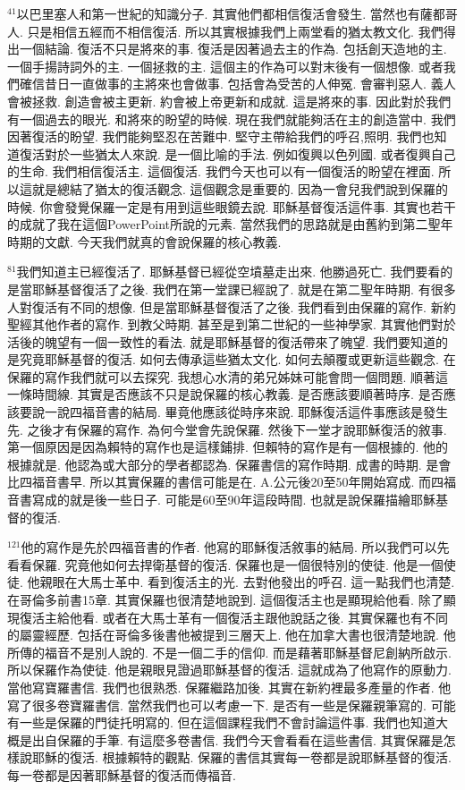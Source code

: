 \documentclass{book}
\begin{document}
$^{41}$以巴里塞人和第一世紀的知識分子.
其實他們都相信復活會發生.
當然也有薩都哥人.
只是相信五經而不相信復活.
所以其實根據我們上兩堂看的猶太教文化.
我們得出一個結論.
復活不只是將來的事.
復活是因著過去主的作為.
包括創天造地的主.
一個手揚詩詞外的主.
一個拯救的主.
這個主的作為可以對末後有一個想像.
或者我們確信昔日一直做事的主將來也會做事.
包括會為受苦的人伸冤.
會審判惡人.
義人會被拯救.
創造會被主更新.
約會被上帝更新和成就.
這是將來的事.
因此對於我們有一個過去的眼光.
和將來的盼望的時候.
現在我們就能夠活在主的創造當中.
我們因著復活的盼望.
我們能夠堅忍在苦難中.
堅守主帶給我們的呼召,照明.
我們也知道復活對於一些猶太人來說.
是一個比喻的手法.
例如復興以色列國.
或者復興自己的生命.
我們相信復活主.
這個復活.
我們今天也可以有一個復活的盼望在裡面.
所以這就是總結了猶太的復活觀念.
這個觀念是重要的.
因為一會兒我們說到保羅的時候.
你會發覺保羅一定是有用到這些眼鏡去說.
耶穌基督復活這件事.
其實也若干的成就了我在這個PowerPoint所說的元素.
當然我們的思路就是由舊約到第二聖年時期的文獻.
今天我們就真的會說保羅的核心教義.

$^{81}$我們知道主已經復活了.
耶穌基督已經從空墳墓走出來.
他勝過死亡.
我們要看的是當耶穌基督復活了之後.
我們在第一堂課已經說了.
就是在第二聖年時期.
有很多人對復活有不同的想像.
但是當耶穌基督復活了之後.
我們看到由保羅的寫作.
新約聖經其他作者的寫作.
到教父時期.
甚至是到第二世紀的一些神學家.
其實他們對於活後的魄望有一個一致性的看法.
就是耶穌基督的復活帶來了魄望.
我們要知道的是究竟耶穌基督的復活.
如何去傳承這些猶太文化.
如何去顛覆或更新這些觀念.
在保羅的寫作我們就可以去探究.
我想心水清的弟兄姊妹可能會問一個問題.
順著這一條時間線.
其實是否應該不只是說保羅的核心教義.
是否應該要順著時序.
是否應該要說一說四福音書的結局.
畢竟他應該從時序來說.
耶穌復活這件事應該是發生先.
之後才有保羅的寫作.
為何今堂會先說保羅.
然後下一堂才說耶穌復活的敘事.
第一個原因是因為賴特的寫作也是這樣鋪排.
但賴特的寫作是有一個根據的.
他的根據就是.
他認為或大部分的學者都認為.
保羅書信的寫作時期.
成書的時期.
是會比四福音書早.
所以其實保羅的書信可能是在.
A.公元後20至50年開始寫成.
而四福音書寫成的就是後一些日子.
可能是60至90年這段時間.
也就是說保羅描繪耶穌基督的復活.

$^{121}$他的寫作是先於四福音書的作者.
他寫的耶穌復活敘事的結局.
所以我們可以先看看保羅.
究竟他如何去捍衛基督的復活.
保羅也是一個很特別的使徒.
他是一個使徒.
他親眼在大馬士革中.
看到復活主的光.
去對他發出的呼召.
這一點我們也清楚.
在哥倫多前書15章.
其實保羅也很清楚地說到.
這個復活主也是顯現給他看.
除了顯現復活主給他看.
或者在大馬士革有一個復活主跟他說話之後.
其實保羅也有不同的屬靈經歷.
包括在哥倫多後書他被提到三層天上.
他在加拿大書也很清楚地說.
他所傳的福音不是別人說的.
不是一個二手的信仰.
而是藉著耶穌基督尼創納所啟示.
所以保羅作為使徒.
他是親眼見證過耶穌基督的復活.
這就成為了他寫作的原動力.
當他寫寶羅書信.
我們也很熟悉.
保羅繼路加後.
其實在新約裡最多產量的作者.
他寫了很多卷寶羅書信.
當然我們也可以考慮一下.
是否有一些是保羅親筆寫的.
可能有一些是保羅的門徒托明寫的.
但在這個課程我們不會討論這件事.
我們也知道大概是出自保羅的手筆.
有這麼多卷書信.
我們今天會看看在這些書信.
其實保羅是怎樣說耶穌的復活.
根據賴特的觀點.
保羅的書信其實每一卷都是說耶穌基督的復活.
每一卷都是因著耶穌基督的復活而傳福音.
\end{document}
